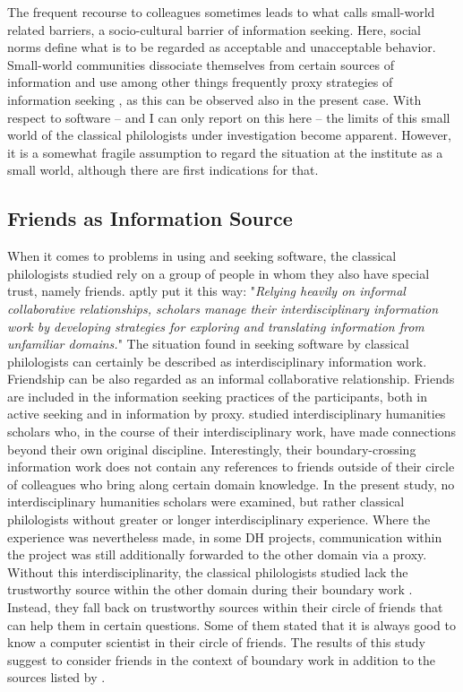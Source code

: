 \documentclass[12pt, a4paper, titlepage, oneside, abstract=true, toc=listof, toc=bibliography, BCOR=1cm]{scrreprt}
\begin{document}
{%
The frequent recourse to colleagues sometimes leads to what \citet[p. 57]{Savolainen2015} calls small-world related barriers, a socio-cultural barrier of information seeking. Here, social norms define what is to be regarded as acceptable and unacceptable behavior. Small-world communities dissociate themselves from certain sources of information and use among other things frequently proxy strategies of information seeking \citep[p. 57]{Savolainen2015}, as this can be observed also in the present case. With respect to software \--- and I can only report on this here \--- the limits of this small world of the classical philologists under investigation become apparent. However, it is a somewhat fragile assumption to regard the situation at the institute as a small world, although there are first indications for that.

\subsection*{Friends as Information Source}

When it comes to problems in using and seeking software, the classical philologists studied rely on a group of people in whom they also have special trust, namely friends. \citet[p. 85]{Palmer2002} aptly put it this way: "\textit{Relying heavily on informal collaborative relationships, scholars manage their interdisciplinary information work by developing strategies for exploring and translating information from unfamiliar domains.}" The situation found in seeking software by classical philologists can certainly be described as interdisciplinary information work. Friendship can be also regarded as an informal collaborative relationship. Friends are included in the information seeking practices of the participants, both in active seeking and in information by proxy. \citet{Palmer2002} studied interdisciplinary humanities scholars who, in the course of their interdisciplinary work, have made connections beyond their own original discipline. Interestingly, their boundary-crossing information work does not contain any references to friends outside of their circle of colleagues who bring along certain domain knowledge. In the present study, no interdisciplinary humanities scholars were examined, but rather classical philologists without greater or longer interdisciplinary experience. Where the experience was nevertheless made, in some DH projects, communication within the project was still additionally forwarded to the other domain via a proxy. Without this interdisciplinarity, the classical philologists studied lack the trustworthy source within the other domain during their boundary work \citet{Gieryn1983}. Instead, they fall back on trustworthy sources within their circle of friends that can help them in certain questions. Some of them stated that it is always good to know a computer scientist in their circle of friends. The results of this study suggest to consider friends in the context of boundary work in addition to the sources listed by \citep{Palmer2002}.

}
\end{document}
